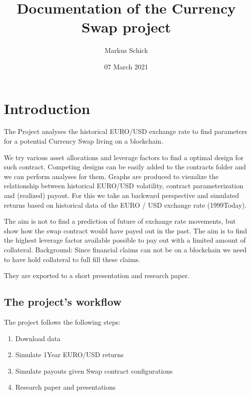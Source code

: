 \documentclass[a4paper,11pt,english]{sphinxmanual}
\title{Documentation of the Currency Swap project}
\date{07 March 2021}
\author{Markus Schick}
\begin{document}
\pagestyle{empty}
\sphinxmaketitle
\pagestyle{plain}
\sphinxtableofcontents
\pagestyle{normal}
\label{\detokenize{index::doc}}



\chapter{Introduction}
\label{\detokenize{introduction:introduction}}\label{\detokenize{introduction:id1}}\label{\detokenize{introduction::doc}}
\sphinxAtStartPar
The Project analyses the historical EURO/USD exchange rate to find parameters for a potential Currency Swap living on a blockchain.

\sphinxAtStartPar
We try various asset allocations and leverage factors to find a optimal design for such contract.
Competing designs can be easily added to the contracts folder and we can perform analyses for them.
Graphs are produced to visualize the relationship between historical EURO/USD volatility, contract parameterization
and (realized) payout. For this we take an backward perspective and simulated returns based on historical data of the EURO / USD exchange rate (1999\sphinxhyphen{}Today).

\sphinxAtStartPar
The aim is not to find a prediction of future of exchange rate movements, but show how the swap contract
would have payed out in the past.
The aim is to find the highest leverage factor available possible to pay out with a limited amount of collateral.
Background: Since financial claims can not be  on a blockchain we need to have hold collateral to full fill these claims.

\sphinxAtStartPar
They are exported to a short presentation and research paper.


\section{The project’s workflow}
\label{\detokenize{introduction:the-projects-workflow}}\label{\detokenize{introduction:getting-started}}
\sphinxAtStartPar
The project follows the following steps:
\begin{enumerate}
%
\item {} 
\sphinxAtStartPar
Download data

\item {} 
\sphinxAtStartPar
Simulate 1\sphinxhyphen{}Year EURO/USD returns

\item {} 
\sphinxAtStartPar
Simulate payouts given Swap contract configurations

\item {} 
\sphinxAtStartPar
Research paper and presentations

\end{enumerate}
\end{document}
